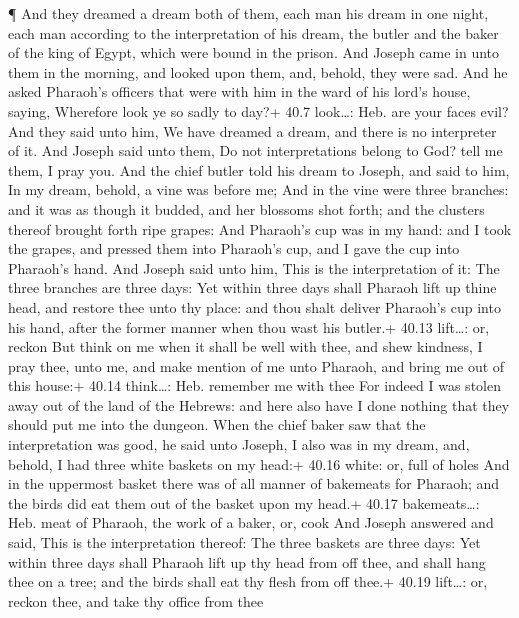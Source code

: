  ¶ And they dreamed a dream both of them, each man his dream
in one night, each man according to the interpretation of his dream, the
butler and the baker of the king of Egypt, which were bound in the
prison.  And Joseph came in unto them in the morning, and
looked upon them, and, behold, they were sad.  And he asked
Pharaoh's officers that were with him in the ward of his lord's house,
saying, Wherefore look ye so sadly to day?+ 40.7 look\ldots: Heb. are
your faces evil?  And they said unto him, We have dreamed a
dream, and there is no interpreter of it. And Joseph said unto them, Do
not interpretations belong to God? tell me them, I pray you.
 And the chief butler told his dream to Joseph, and said to
him, In my dream, behold, a vine was before me;  And in the
vine were three branches: and it was as though it budded, and her
blossoms shot forth; and the clusters thereof brought forth ripe grapes:
 And Pharaoh's cup was in my hand: and I took the grapes,
and pressed them into Pharaoh's cup, and I gave the cup into Pharaoh's
hand.  And Joseph said unto him, This is the interpretation
of it: The three branches are three days:  Yet within three
days shall Pharaoh lift up thine head, and restore thee unto thy place:
and thou shalt deliver Pharaoh's cup into his hand, after the former
manner when thou wast his butler.+ 40.13 lift\ldots: or, reckon
 But think on me when it shall be well with thee, and shew
kindness, I pray thee, unto me, and make mention of me unto Pharaoh, and
bring me out of this house:+ 40.14 think\ldots: Heb. remember me with
thee  For indeed I was stolen away out of the land of the
Hebrews: and here also have I done nothing that they should put me into
the dungeon.  When the chief baker saw that the
interpretation was good, he said unto Joseph, I also was in my dream,
and, behold, I had three white baskets on my head:+ 40.16 white: or,
full of holes  And in the uppermost basket there was of all
manner of bakemeats for Pharaoh; and the birds did eat them out of the
basket upon my head.+ 40.17 bakemeats\ldots: Heb. meat of Pharaoh, the
work of a baker, or, cook  And Joseph answered and said,
This is the interpretation thereof: The three baskets are three days:
 Yet within three days shall Pharaoh lift up thy head from
off thee, and shall hang thee on a tree; and the birds shall eat thy
flesh from off thee.+ 40.19 lift\ldots: or, reckon thee, and take thy
office from thee

